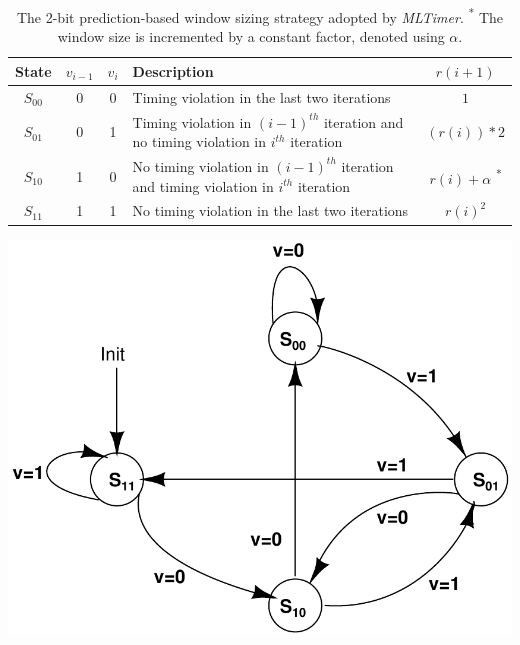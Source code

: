 \begin{table}[!t]
 \begin{minipage}{0.45\textwidth}
 \caption{The 2-bit prediction-based window sizing strategy adopted by {\it MLTimer}. \textsuperscript{*} The window size is incremented by a constant factor, denoted using $\alpha$.}
 \label{tab:window-sizing-strategy}

 \centering


 \begin{tabular}{|c|c|c|p{4cm}|c|}
 \hline
 State & $v_{i-1}$ &$v_i$ &Description &$r(i+1)$ \\
 \hline
 $S_{00}$ &0 &0 &Timing violation in the last two iterations& $1$ \\
 \hline
 $S_{01}$ &0 &1 &Timing violation in $(i-1)^{th}$ iteration and no timing violation in $i^{th}$ iteration& $(r(i))*2$ \\
 \hline
 $S_{10}$ &1 &0 &No timing violation in $(i-1)^{th}$ iteration and timing violation in $i^{th}$ iteration& $r(i) + \alpha$ \textsuperscript{*} \\
 \hline
 $S_{11}$ &1 &1 &No timing violation in the last two iterations& $r(i)^2$ \\

 \hline

 \end{tabular}%
 \end{minipage}\hfill
\begin{minipage}{0.35\textwidth}
 \begin{center}
 \includegraphics[scale=0.4]{Chapter3/fig/state_machine_window_sizing}
 \label{fig:state-machine-window-sizing}
 \end{center}
\end{minipage}
\end{table}


